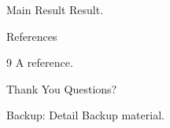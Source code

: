 \documentclass{beamer}
\begin{document}
\begin{frame}{Main Result}
  Result.
\end{frame}
\begin{frame}{References}
  \begin{thebibliography}{9}
     A reference.
  \end{thebibliography}
\end{frame}
\begin{frame}{Thank You}
  Questions?
\end{frame}
\begin{frame}{Backup: Detail}
  Backup material.
\end{frame}
\end{document}
